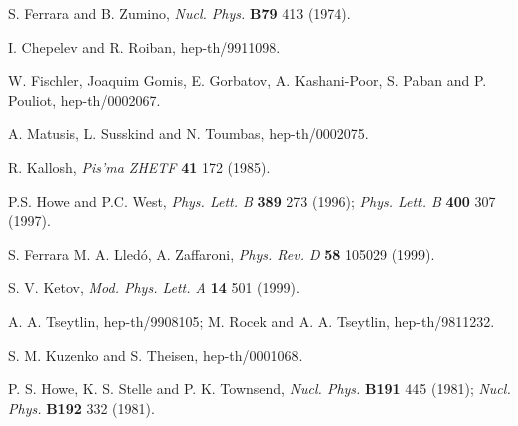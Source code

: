 \documentclass[a4paper,12pt]{article}
\begin{document}
\begin{thebibliography}{100}
 S. Ferrara and B. Zumino, {\it Nucl. Phys.} {\bf B79}  413
(1974).


  I. Chepelev and  R. Roiban,  hep-th/9911098.

  W. Fischler, Joaquim Gomis, E. Gorbatov, A. Kashani-Poor, S.
Paban and P. Pouliot, hep-th/0002067.

  A. Matusis, L. Susskind and  N. Toumbas, hep-th/0002075.

 R. Kallosh, {\it Pis'ma ZHETF} {\bf 41} 172 (1985).

 P.S. Howe and P.C. West, {\it Phys. Lett. B} {\bf 389} 273 (1996);
{\it Phys. Lett. B} {\bf 400} 307 (1997).

 S. Ferrara M. A. Lled\'o, A. Zaffaroni, {\it Phys. Rev. D}
{\bf 58} 105029 (1999).

 S. V. Ketov, {\it Mod. Phys. Lett. A} {\bf 14} 501 (1999).

 A. A. Tseytlin,  hep-th/9908105; M. Rocek and A. A. Tseytlin,
hep-th/9811232.

 S. M. Kuzenko and S. Theisen, hep-th/0001068.

 P. S. Howe, K. S.  Stelle and P. K. Townsend, {\it Nucl.
Phys.} {\bf B191} 445 (1981);
{\it Nucl. Phys.} {\bf B192} 332 (1981).



\end{thebibliography} 
\end{document}
